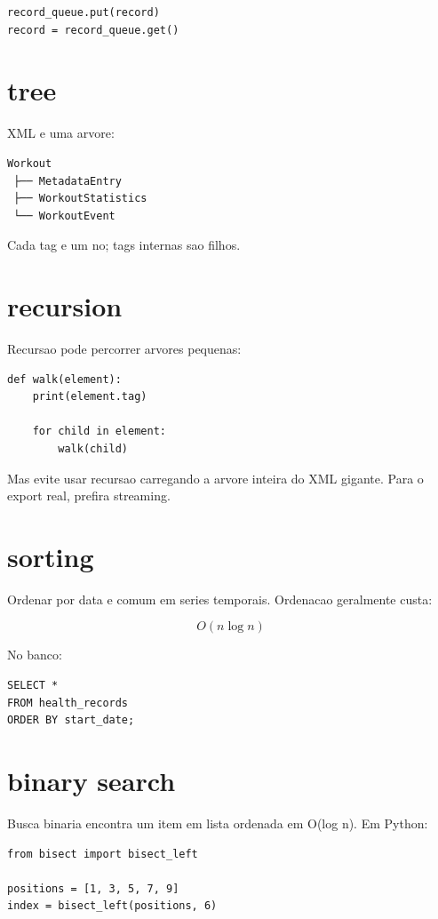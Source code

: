\begin{lstlisting}[style=devbutterpython]
record_queue.put(record)
record = record_queue.get()
\end{lstlisting}

\section{tree}

XML e uma arvore:

\begin{verbatim}
Workout
 ├── MetadataEntry
 ├── WorkoutStatistics
 └── WorkoutEvent
\end{verbatim}

Cada tag e um no; tags internas sao filhos.

\section{recursion}

Recursao pode percorrer arvores pequenas:

\begin{lstlisting}[style=devbutterpython]
def walk(element):
    print(element.tag)

    for child in element:
        walk(child)
\end{lstlisting}

Mas evite usar recursao carregando a arvore inteira do XML gigante. Para o export real, prefira streaming.

\section{sorting}

Ordenar por data e comum em series temporais. Ordenacao geralmente custa:

\[
O(n \log n)
\]

No banco:

\begin{lstlisting}[style=devbuttersql]
SELECT *
FROM health_records
ORDER BY start_date;
\end{lstlisting}

\section{binary search}

Busca binaria encontra um item em lista ordenada em O(log n). Em Python:

\begin{lstlisting}[style=devbutterpython]
from bisect import bisect_left

positions = [1, 3, 5, 7, 9]
index = bisect_left(positions, 6)
\end{lstlisting}

